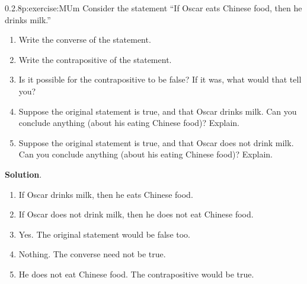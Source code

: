 \documentclass[twoside,11pt,]{book}
\newcommand{\blocktitlefont}{\relax}
\numberwithin{equation}{chapter}
\begin{document}
\begin{divisionsolution}{0.2.8}{}{p:exercise:MUm}%
Consider the statement ``If Oscar eats Chinese food, then he drinks milk.''%
\begin{enumerate}[label=(\alph*)]
\item{}Write the converse of the statement.%
\item{}Write the contrapositive of the statement.%
\item{}Is it possible for the contrapositive to be false? If it was, what would that tell you?%
\item{}Suppose the original statement is true, and that Oscar drinks milk. Can you conclude anything (about his eating Chinese food)? Explain.%
\item{}Suppose the original statement is true, and that Oscar does not drink milk. Can you conclude anything (about his eating Chinese food)? Explain.%
\end{enumerate}
%
\par\smallskip%
\noindent\textbf{\blocktitlefont Solution}.\quad{}%
\begin{enumerate}[label=(\alph*)]
\item{}If Oscar drinks milk, then he eats Chinese food.%
\item{}If Oscar does not drink milk, then he does not eat Chinese food.%
\item{}Yes. The original statement would be false too.%
\item{}Nothing. The converse need not be true.%
\item{}He does not eat Chinese food. The contrapositive would be true.%
\end{enumerate}
\end{divisionsolution}%
\end{document}
